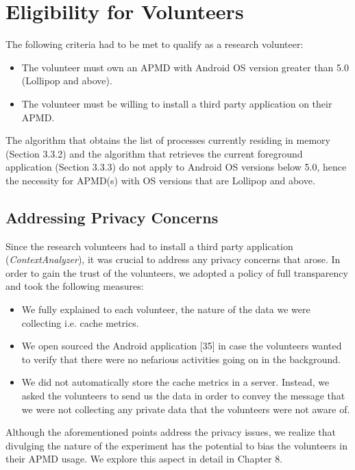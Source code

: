 \documentclass[12pt]{uthesis-v12}  %
\begin{document}
	\section{Eligibility for Volunteers}
		The following criteria had to be met to qualify as a research volunteer:
		
		\begin{itemize}
			\item The volunteer must own an APMD with Android OS version greater than 5.0 (Lollipop and above).
			\item The volunteer must be willing to install a third party application on their APMD.
		\end{itemize}
		
		The algorithm that obtains the list of processes currently residing in memory (Section 3.3.2) and the algorithm that retrieves the current foreground application (Section 3.3.3) do not apply to Android OS versions below 5.0, hence the necessity for APMD(s) with OS versions that are Lollipop and above.
		
		\subsection{Addressing Privacy Concerns}
			Since the research volunteers had to install a third party application ({\em ContextAnalyzer}), it was crucial to address any privacy concerns that arose. In order to gain the trust of the volunteers, we adopted a policy of full transparency and took the following measures:
			
			\begin{itemize}
				\item We fully explained to each volunteer, the nature of the data we were collecting i.e. cache metrics.
				\item We open sourced the Android application [35] in case the volunteers wanted to verify that there were no nefarious activities going on in the background.
				\item We did not automatically store the cache metrics in a server. Instead, we asked the volunteers to send us the data in order to convey the message that we were not collecting any private data that the volunteers were not aware of.
			\end{itemize}
			
			Although the aforementioned points address the privacy issues, we realize that divulging the nature of the experiment has the potential to bias the volunteers in their APMD usage. We explore this aspect in detail in Chapter 8. 
	
\end{document}
